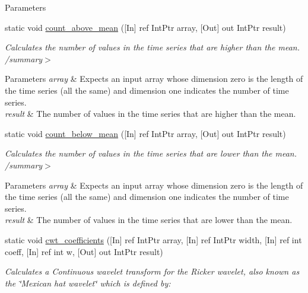 \begin{DoxyCompactItemize}
\begin{DoxyCompactList}
\begin{DoxyParams}{Parameters}
\hline
\end{DoxyParams}
\end{DoxyCompactList}\item 
static void \mbox{\hyperlink{classkhiva_1_1interop_1_1_d_l_l_features_a67ac8d1dbcb01c227c9c27f78e959aed}{count\+\_\+above\+\_\+mean}} (\mbox{[}In\mbox{]} ref Int\+Ptr array, \mbox{[}Out\mbox{]} out Int\+Ptr result)
\begin{DoxyCompactList}\small\item\em Calculates the number of values in the time series that are higher than the mean. /summary$>$ 
\begin{DoxyParams}{Parameters}
{\em array} & Expects an input array whose dimension zero is the length of the time series (all the same) and dimension one indicates the number of time series.\\
\hline
{\em result} & The number of values in the time series that are higher than the mean.\\
\hline
\end{DoxyParams}
\end{DoxyCompactList}\item 
static void \mbox{\hyperlink{classkhiva_1_1interop_1_1_d_l_l_features_a5559115107d672d504af9fec765278e8}{count\+\_\+below\+\_\+mean}} (\mbox{[}In\mbox{]} ref Int\+Ptr array, \mbox{[}Out\mbox{]} out Int\+Ptr result)
\begin{DoxyCompactList}\small\item\em Calculates the number of values in the time series that are lower than the mean. /summary$>$ 
\begin{DoxyParams}{Parameters}
{\em array} & Expects an input array whose dimension zero is the length of the time series (all the same) and dimension one indicates the number of time series.\\
\hline
{\em result} & The number of values in the time series that are lower than the mean.\\
\hline
\end{DoxyParams}
\end{DoxyCompactList}\item 
static void \mbox{\hyperlink{classkhiva_1_1interop_1_1_d_l_l_features_acf0dfe79937a46d9cfa3125d24b440d7}{cwt\+\_\+coefficients}} (\mbox{[}In\mbox{]} ref Int\+Ptr array, \mbox{[}In\mbox{]} ref Int\+Ptr width, \mbox{[}In\mbox{]} ref int coeff, \mbox{[}In\mbox{]} ref int w, \mbox{[}Out\mbox{]} out Int\+Ptr result)
\begin{DoxyCompactList}\small\item\em Calculates a Continuous wavelet transform for the Ricker wavelet, also known as the \char`\"{}\+Mexican hat wavelet\char`\"{} which is defined by\+: \end{DoxyCompactList}\item 

\end{DoxyCompactItemize}
